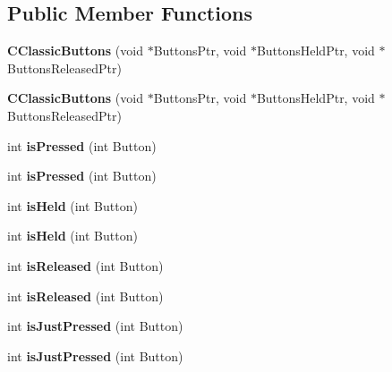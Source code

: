 \subsection*{Public Member Functions}
\begin{DoxyCompactItemize}
\item 
\hypertarget{class_c_classic_buttons_ae98fc8217e2e7a38e9393be008534268}{{\bfseries C\-Classic\-Buttons} (void $\ast$Buttons\-Ptr, void $\ast$Buttons\-Held\-Ptr, void $\ast$Buttons\-Released\-Ptr)}\label{class_c_classic_buttons_ae98fc8217e2e7a38e9393be008534268}

\item 
\hypertarget{class_c_classic_buttons_ae98fc8217e2e7a38e9393be008534268}{{\bfseries C\-Classic\-Buttons} (void $\ast$Buttons\-Ptr, void $\ast$Buttons\-Held\-Ptr, void $\ast$Buttons\-Released\-Ptr)}\label{class_c_classic_buttons_ae98fc8217e2e7a38e9393be008534268}

\item 
\hypertarget{class_c_button_base_a0d4758b9e756a8c3c2bb39b907ea9170}{int {\bfseries is\-Pressed} (int Button)}\label{class_c_button_base_a0d4758b9e756a8c3c2bb39b907ea9170}

\item 
\hypertarget{class_c_button_base_a0d4758b9e756a8c3c2bb39b907ea9170}{int {\bfseries is\-Pressed} (int Button)}\label{class_c_button_base_a0d4758b9e756a8c3c2bb39b907ea9170}

\item 
\hypertarget{class_c_button_base_a67e38daead9d22e33f6a3d85902d1f98}{int {\bfseries is\-Held} (int Button)}\label{class_c_button_base_a67e38daead9d22e33f6a3d85902d1f98}

\item 
\hypertarget{class_c_button_base_a67e38daead9d22e33f6a3d85902d1f98}{int {\bfseries is\-Held} (int Button)}\label{class_c_button_base_a67e38daead9d22e33f6a3d85902d1f98}

\item 
\hypertarget{class_c_button_base_a575dee487bcca1abf29c1084dfdd5bb8}{int {\bfseries is\-Released} (int Button)}\label{class_c_button_base_a575dee487bcca1abf29c1084dfdd5bb8}

\item 
\hypertarget{class_c_button_base_a575dee487bcca1abf29c1084dfdd5bb8}{int {\bfseries is\-Released} (int Button)}\label{class_c_button_base_a575dee487bcca1abf29c1084dfdd5bb8}

\item 
\hypertarget{class_c_button_base_ab74fd21217c5e379a613b7474af4f9b8}{int {\bfseries is\-Just\-Pressed} (int Button)}\label{class_c_button_base_ab74fd21217c5e379a613b7474af4f9b8}

\item 
\hypertarget{class_c_button_base_ab74fd21217c5e379a613b7474af4f9b8}{int {\bfseries is\-Just\-Pressed} (int Button)}\label{class_c_button_base_ab74fd21217c5e379a613b7474af4f9b8}

\end{DoxyCompactItemize}


